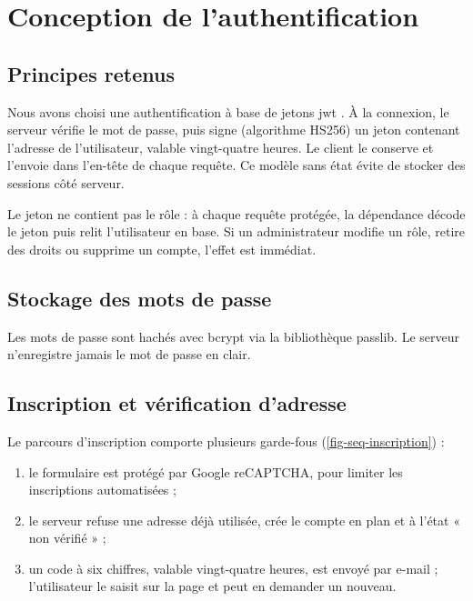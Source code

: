 \section{Conception de l'authentification}

\subsection{Principes retenus}
Nous avons choisi une authentification à base de jetons \gls{jwt} \cite{rfc7519}. À la connexion, le serveur vérifie le mot de passe, puis signe (algorithme HS256) un jeton contenant l'adresse de l'utilisateur, valable vingt-quatre heures. Le client le conserve et l'envoie dans l'en-tête  de chaque requête. Ce modèle sans état évite de stocker des sessions côté serveur.

Le jeton ne contient pas le rôle : à chaque requête protégée, la dépendance  décode le jeton puis relit l'utilisateur en base. Si un administrateur modifie un rôle, retire des droits ou supprime un compte, l'effet est immédiat.

\subsection{Stockage des mots de passe}
Les mots de passe sont hachés avec bcrypt \cite{provos1999bcrypt} via la bibliothèque passlib. Le serveur n'enregistre jamais le mot de passe en clair. 

\subsection{Inscription et vérification d'adresse}
Le parcours d'inscription comporte plusieurs garde-fous (\cref{fig-seq-inscription}) :
\begin{enumerate}
  \item le formulaire est protégé par Google reCAPTCHA, pour limiter les inscriptions automatisées ;
  \item le serveur refuse une adresse déjà utilisée, crée le compte en plan  et à l'état « non vérifié » ;
  \item un code à six chiffres, valable vingt-quatre heures, est envoyé par e-mail ; l'utilisateur le saisit sur la page  et peut en demander un nouveau.
\end{enumerate}

